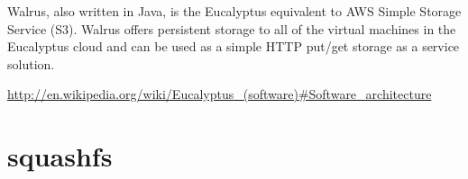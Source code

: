 Walrus, also written in Java, is the Eucalyptus equivalent to AWS Simple Storage
Service (S3). Walrus offers persistent storage to all of the virtual machines in
the Eucalyptus cloud and can be used as a simple HTTP put/get storage as a
service solution.

\url{http://en.wikipedia.org/wiki/Eucalyptus_(software)#Software_architecture}

\section{squashfs}
\label{sec:squashfs}

